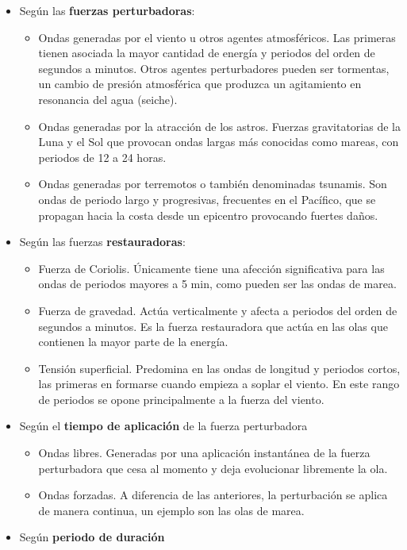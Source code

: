 \begin{itemize}
\item
  Según las \textbf{fuerzas perturbadoras}:

  \begin{itemize}
  \item
    Ondas generadas por el viento u otros agentes atmosféricos. Las
    primeras tienen asociada la mayor cantidad de energía y periodos del
    orden de segundos a minutos. Otros agentes perturbadores pueden ser
    tormentas, un cambio de presión atmosférica que produzca un
    agitamiento en resonancia del agua (seiche).
  \item
    Ondas generadas por la atracción de los astros. Fuerzas
    gravitatorias de la Luna y el Sol que provocan ondas largas más
    conocidas como mareas, con periodos de 12 a 24 horas.
  \item
    Ondas generadas por terremotos o también denominadas tsunamis. Son
    ondas de periodo largo y progresivas, frecuentes en el Pacífico, que
    se propagan hacia la costa desde un epicentro provocando fuertes
    daños.
  \end{itemize}
\item
  Según las fuerzas \textbf{restauradoras}:

  \begin{itemize}
  \item
    Fuerza de Coriolis. Únicamente tiene una afección significativa para
    las ondas de periodos mayores a 5 min, como pueden ser las ondas de
    marea.
  \item
    Fuerza de gravedad. Actúa verticalmente y afecta a periodos del
    orden de segundos a minutos. Es la fuerza restauradora que actúa en
    las olas que contienen la mayor parte de la energía.
  \item
    Tensión superficial. Predomina en las ondas de longitud y periodos
    cortos, las primeras en formarse cuando empieza a soplar el viento.
    En este rango de periodos se opone principalmente a la fuerza del
    viento.
  \end{itemize}
\item
  Según el \textbf{tiempo de aplicación} de la fuerza perturbadora

  \begin{itemize}
  \item
    Ondas libres. Generadas por una aplicación instantánea de la fuerza
    perturbadora que cesa al momento y deja evolucionar libremente la
    ola.
  \item
    Ondas forzadas. A diferencia de las anteriores, la perturbación se
    aplica de manera continua, un ejemplo son las olas de marea.
  \end{itemize}
\item
  Según \textbf{periodo de duración}


\end{itemize}
